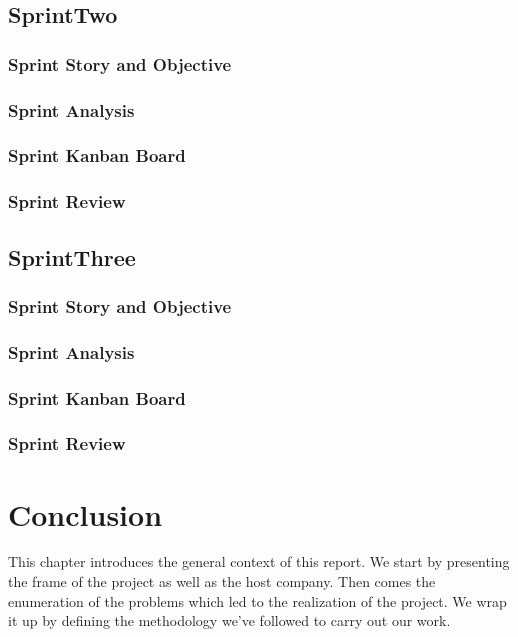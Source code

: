 \subsection{SprintTwo}
\subsubsection{Sprint Story and Objective}
\subsubsection{Sprint Analysis}
\subsubsection{Sprint Kanban Board}
\subsubsection{Sprint Review}

\subsection{SprintThree}
\subsubsection{Sprint Story and Objective}
\subsubsection{Sprint Analysis}
\subsubsection{Sprint Kanban Board}
\subsubsection{Sprint Review}

\setcounter{secnumdepth}{0} %
\section{Conclusion}
This chapter introduces the general context of this report. We start by presenting the frame of the project as well as the host company. Then comes the enumeration of the problems which led to the realization of the project. We wrap it up by defining the methodology we’ve followed to carry out our work.

